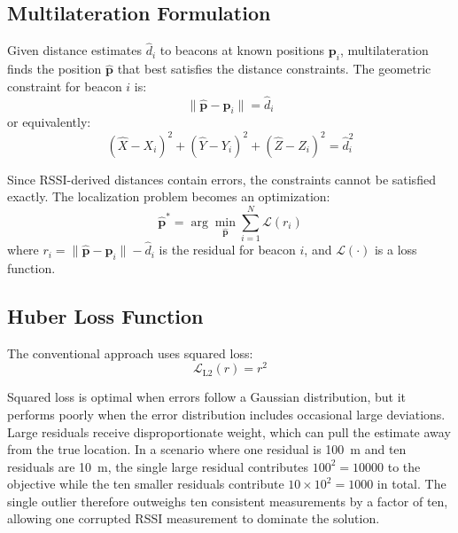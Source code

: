 \documentclass[master,final,11pt]{iscs-thesis}
\begin{document}
\subsection{Multilateration Formulation}

Given distance estimates $\hat{d}_i$ to beacons at known positions $\mathbf{p}_i$, multilateration finds the position $\hat{\mathbf{p}}$ that best satisfies the distance constraints.
The geometric constraint for beacon $i$ is:
\begin{equation}
    \|\hat{\mathbf{p}} - \mathbf{p}_i\| = \hat{d}_i
\end{equation}
or equivalently:
\begin{equation}
    (\hat{X} - X_i)^2 + (\hat{Y} - Y_i)^2 + (\hat{Z} - Z_i)^2 = \hat{d}_i^2
    \label{eq:distance_constraint}
\end{equation}

Since RSSI-derived distances contain errors, the constraints cannot be satisfied exactly.
The localization problem becomes an optimization:
\begin{equation}
    \hat{\mathbf{p}}^* = \arg\min_{\hat{\mathbf{p}}} \sum_{i=1}^{N} \mathcal{L}(r_i)
    \label{eq:optimization}
\end{equation}
where $r_i = \|\hat{\mathbf{p}} - \mathbf{p}_i\| - \hat{d}_i$ is the residual for beacon $i$, and $\mathcal{L}(\cdot)$ is a loss function.

\subsection{Huber Loss Function}

The conventional approach uses squared loss:
\begin{equation}
    \mathcal{L}_{\text{L2}}(r) = r^2
\end{equation}

Squared loss is optimal when errors follow a Gaussian distribution, but it performs poorly when the error distribution includes occasional large deviations.
Large residuals receive disproportionate weight, which can pull the estimate away from the true location.
In a scenario where one residual is 100~m and ten residuals are 10~m, the single large residual contributes $100^2 = 10000$ to the objective while the ten smaller residuals contribute $10 \times 10^2 = 1000$ in total.
The single outlier therefore outweighs ten consistent measurements by a factor of ten, allowing one corrupted RSSI measurement to dominate the solution.
\end{document}
